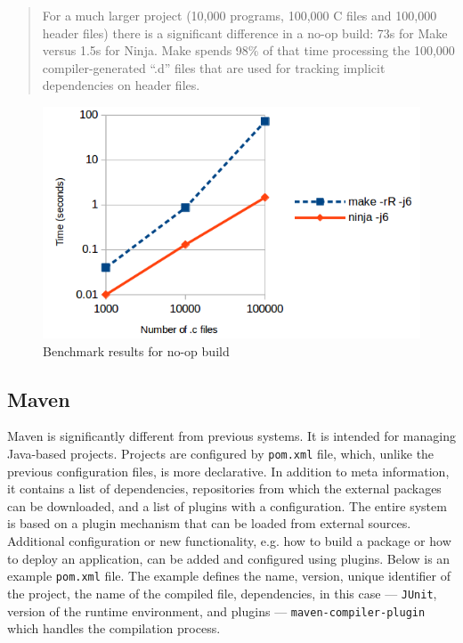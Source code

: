 \begin{quote}
For a much larger project (10,000 programs, 100,000 C files and 100,000
header files) there is a significant difference in a no-op build: 73s
for Make versus 1.5s for Ninja. Make spends 98\% of that time processing
the 100,000 compiler-generated ``.d'' files that are used for tracking
implicit dependencies on header files.
\end{quote}

\begin{figure}
\centering
\includegraphics[scale=0.48]{./no-op-build.png}
\caption{Benchmark results for no-op build \cite{BENCHMARK}}
\end{figure}

\hypertarget{maven}{%
\subsection{Maven}\label{maven}}

Maven is significantly different from previous systems. It is intended
for managing Java-based projects. Projects are configured by \texttt{pom.xml}
file, which, unlike the previous configuration files, is more
declarative. In addition to meta information, it contains a list of
dependencies, repositories from which the external packages can be
downloaded, and a list of plugins with a configuration. The entire system
is based on a plugin mechanism that can be loaded from external
sources. Additional configuration or new functionality, e.g. how to
build a package or how to deploy an application, can be added and
configured using plugins. Below is an example \texttt{pom.xml} file.
The example defines the name, version, unique identifier of the project,
the name of the compiled file, dependencies, in this case --- \texttt{JUnit},
version of the runtime environment, and plugins --- \texttt{maven-compiler-plugin}
which handles the compilation process.

